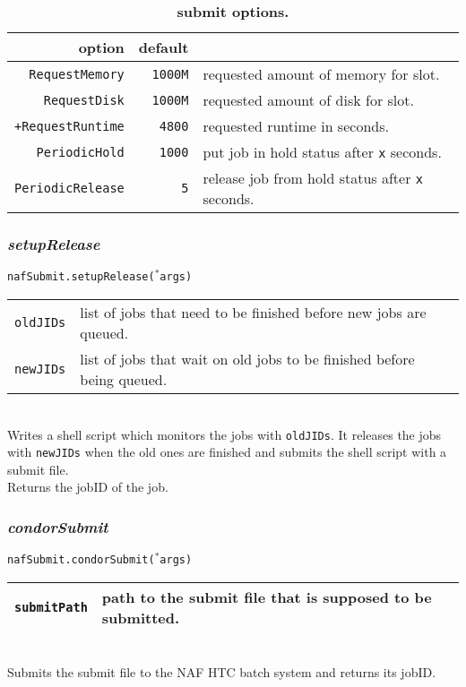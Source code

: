 \documentclass[12pt, a4paper]{article}
\newcommand{\args}{$^*$args}
\begin{document}
\begin{table}
\caption{\textbf{submit options.}}\label{submitOptionTable}
\begin{tabular}{r|rl}
option					& default 			&	\\
\hline
\texttt{RequestMemory}	& \texttt{1000M}	&	requested amount of memory for slot.\\
\texttt{RequestDisk}	& \texttt{1000M}	&	requested amount of disk for slot.\\
\texttt{+RequestRuntime}& \texttt{4800}		&	requested runtime in seconds.\\
\texttt{PeriodicHold}	& \texttt{1000}		&	put job in hold status after \texttt{x} seconds.\\
\texttt{PeriodicRelease}& \texttt{5}		&	release job from hold status after \texttt{x} seconds.\\
\end{tabular}
\end{table}


\subsubsection{\textit{setupRelease}}
\texttt{nafSubmit.setupRelease(\args)}\\
\begin{tabular}{r|l}
\hline
\texttt{oldJIDs}	&	list of jobs that need to be finished before new jobs are queued.\\
\texttt{newJIDs}	&	list of jobs that wait on old jobs to be finished before being queued.\\
\hline
\end{tabular}
\\
Writes a shell script which monitors the jobs with \texttt{oldJIDs}. It releases the jobs with \texttt{newJIDs} when the old ones are finished and submits the shell script with a submit file.\\
Returns the jobID of the job.

\subsubsection{\textit{condorSubmit}}
\texttt{nafSubmit.condorSubmit(\args)}\\
\begin{tabular}{r|l}
\hline
\texttt{submitPath}	&	path to the submit file that is supposed to be submitted.\\
\hline
\end{tabular}
\\
Submits the submit file to the NAF HTC batch system and returns its jobID.
\end{document}
